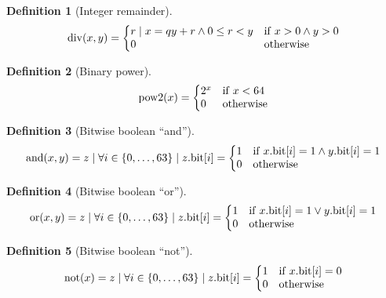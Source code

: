 \documentclass[a4paper,10pt]{article}
\newcommand{\bitno}[2]{#1.\mathrm{bit}[#2]}
\newcommand{\range}[2]{\{#1,\ldots,#2\}}
\DeclareMathOperator{\Div}{div}
\DeclareMathOperator{\BinPow}{pow2}
\DeclareMathOperator{\BitAnd}{and}
\DeclareMathOperator{\BitOr}{or}
\DeclareMathOperator{\BitNot}{not}
\theoremstyle{definition}
\newtheorem{definition}{Definition}
\begin{document}
\begin{definition}[Integer remainder]
  \[ \Div(x, y) = 
    \left\{
      \begin{array}{@{}ll@{}}
        r \mid x = qy + r \wedge 0 \leq r < y & \mathrm{if} \; x > 0 \wedge y > 0 \\
        0 & \textrm{otherwise}
      \end{array}
    \right. \]
\end{definition}

\begin{definition}[Binary power]
  \[ \BinPow(x) = 
    \left\{
      \begin{array}{@{}ll@{}}
        2^x & \mathrm{if} \; x < 64 \\
        0   & \textrm{otherwise}
      \end{array}
    \right. \]
\end{definition}

\begin{definition}[Bitwise boolean ``and'']
  \[ \BitAnd(x, y) = z \mid  
    \forall i \in \range{0}{63} \mid \bitno{z}{i} = \left\{
      \begin{array}{@{}ll@{}}
        1 & \mathrm{if} \; \bitno{x}{i} = 1 \wedge \bitno{y}{i} = 1 \\
        0 & \mathrm{otherwise}
      \end{array}
    \right. \]
\end{definition}

\begin{definition}[Bitwise boolean ``or'']
  \[ \BitOr(x, y) = z \mid  
    \forall i \in \range{0}{63} \mid \bitno{z}{i} = \left\{
      \begin{array}{@{}ll@{}}
        1 & \mathrm{if} \; \bitno{x}{i} = 1 \vee \bitno{y}{i} = 1 \\
        0 & \mathrm{otherwise}
      \end{array}
    \right. \]
\end{definition}

\begin{definition}[Bitwise boolean ``not'']
  \[ \BitNot(x) = z \mid  
    \forall i \in \range{0}{63} \mid \bitno{z}{i} = \left\{
      \begin{array}{@{}ll@{}}
        1 & \mathrm{if} \; \bitno{x}{i} = 0 \\
        0 & \mathrm{otherwise}
      \end{array}
    \right. \]
\end{definition}
\end{document}
